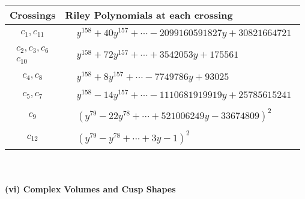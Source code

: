 \documentclass[1p]{elsarticle_modified}
\theoremstyle{definition}
\begin{document}
\begin{tabular}{m{50pt}|m{274pt}}
Crossings & \hspace{64pt}Riley Polynomials at each crossing \\
\hline $$\begin{aligned}c_{1},c_{11}\end{aligned}$$&$\begin{aligned}
&y^{158}+40 y^{157}+\cdots-2099160591827 y+30821664721
\end{aligned}$\\
\hline $$\begin{aligned}c_{2},c_{3},c_{6}\\c_{10}\end{aligned}$$&$\begin{aligned}
&y^{158}+72 y^{157}+\cdots+3542053 y+175561
\end{aligned}$\\
\hline $$\begin{aligned}c_{4},c_{8}\end{aligned}$$&$\begin{aligned}
&y^{158}+8 y^{157}+\cdots-7749786 y+93025
\end{aligned}$\\
\hline $$\begin{aligned}c_{5},c_{7}\end{aligned}$$&$\begin{aligned}
&y^{158}-14 y^{157}+\cdots-1110681919919 y+25785615241
\end{aligned}$\\
\hline $$\begin{aligned}c_{9}\end{aligned}$$&$\begin{aligned}
&(y^{79}-22 y^{78}+\cdots+521006249 y-33674809)^{2}
\end{aligned}$\\
\hline $$\begin{aligned}c_{12}\end{aligned}$$&$\begin{aligned}
&(y^{79}- y^{78}+\cdots+3 y-1)^{2}
\end{aligned}$\\
\hline
\end{tabular}\\~\\
\newpage\flushleft \textbf{(vi) Complex Volumes and Cusp Shapes}
\end{document}
